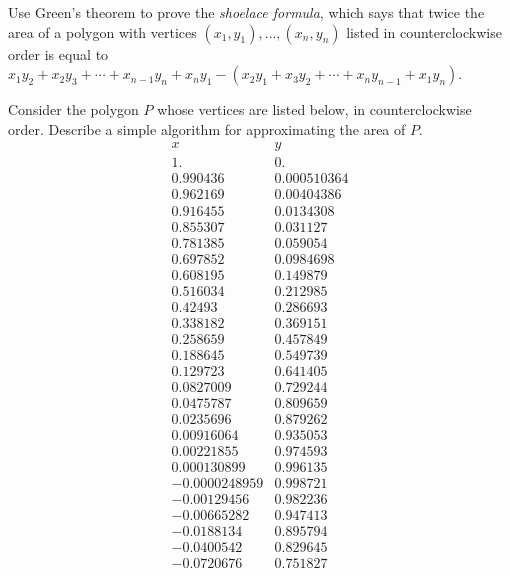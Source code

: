 \documentclass{watsonbook}
\begin{document}
\begin{aexercise}
  Use Green's theorem to prove the \textit{shoelace
    formula}, which says that twice the area of a polygon with vertices
  $(x_1,y_1),\ldots,(x_n,y_n)$ listed in counterclockwise order is equal
  to 
  $x_1y_2 + x_2 y_3 + \cdots + x_{n-1}y_n + x_n y_1 - (x_2 y_1 + x_3 y_2
  + \cdots + x_{n}y_{n-1}+ x_1 y_n)$.
\end{aexercise}

\begin{aexercise}
  Consider the polygon $P$ whose vertices are listed below, in
  counterclockwise order. Describe a simple algorithm for
  approximating the area of $P$.  {\tiny
    $$
    \begin{array}{cc}
      x & y \\ \hline 
      1. & 0. \\
      0.990436 & 0.000510364 \\
      0.962169 & 0.00404386 \\
      0.916455 & 0.0134308 \\
      0.855307 & 0.031127 \\
      0.781385 & 0.059054 \\
      0.697852 & 0.0984698 \\
      0.608195 & 0.149879 \\
      0.516034 & 0.212985 \\
      0.42493 & 0.286693 \\
      0.338182 & 0.369151 \\
      0.258659 & 0.457849 \\
      0.188645 & 0.549739 \\
      0.129723 & 0.641405 \\
      0.0827009 & 0.729244 \\
      0.0475787 & 0.809659 \\
      0.0235696 & 0.879262 \\
      0.00916064 & 0.935053 \\
      0.00221855 & 0.974593 \\
      0.000130899 & 0.996135 \\
      -0.0000248959 & 0.998721 \\
      -0.00129456 & 0.982236 \\
      -0.00665282 & 0.947413 \\
      -0.0188134 & 0.895794 \\
      -0.0400542 & 0.829645 \\
      -0.0720676 & 0.751827 \\

\end{array}$$}
\end{aexercise}
\end{document}
